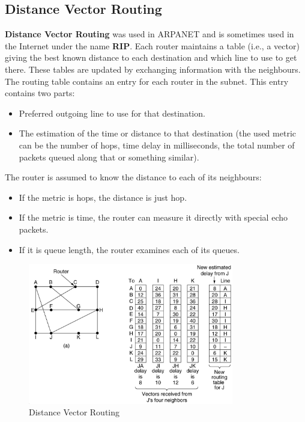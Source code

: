 \documentclass[a4paper,11pt]{article}
\begin{document}
\subsection{Distance Vector Routing}
\textbf{Distance Vector Routing} was used in ARPANET and is sometimes used in the Internet under the name
\textbf{RIP}.
Each router maintains a table (i.e., a vector) giving the best known distance to each destination and which line
to use to get there.
These tables are updated by exchanging information with the neighbours.
The routing table contains an entry for each router in the subnet.
This entry contains two parts:
\begin{itemize}
    \item   Preferred outgoing line to use for that destination.
    \item   The estimation of the time or distance to that destination (the used metric can be the number of hops,
            time delay in milliseconds, the total number of packets queued along that or something similar).
\end{itemize}

The router is assumed to know the distance to each of its neighbours:
\begin{itemize}
    \item   If the metric is hops, the distance is just hop.
    \item   If the metric is time, the router can measure it directly with special echo packets.
    \item   If it is queue length, the router examines each of its queues.
\end{itemize}

\begin{figure}[H]
    \centering
    \includegraphics[width=0.8\textwidth]{./images/distance_vector_routing.png}
    \caption{Distance Vector Routing}
\end{figure}
\end{document}
